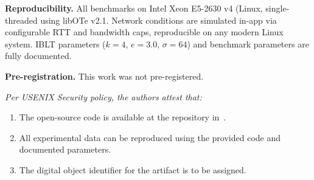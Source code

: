 \textbf{Reproducibility.} All benchmarks on Intel Xeon E5-2630 v4 (Linux, single-threaded
using libOTe v2.1. Network conditions are simulated in-app via configurable
RTT and bandwidth caps, reproducible on any modern Linux system. IBLT
parameters ($k = 4$, $e = 3.0$, $\sigma = 64$) and benchmark parameters are
fully documented.

\textbf{Pre-registration.} This work was not pre-registered.

\smallskip
\noindent\textit{Per USENIX Security policy, the authors attest that:}
\begin{enumerate}
\item The open-source code is available at the repository in~\cite{code}.
\item All experimental data can be reproduced using the provided code and
documented parameters.
\item The digital object identifier for the artifact is to be assigned.
\end{enumerate}

